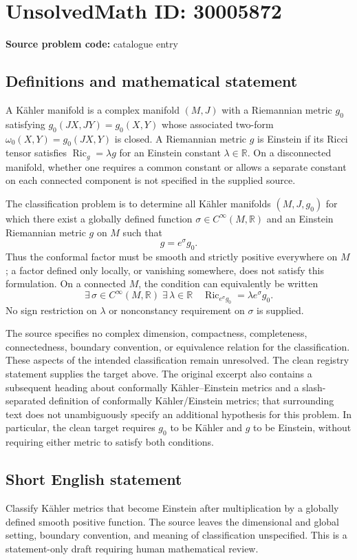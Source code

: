 \documentclass[11pt]{article}
\newcommand{\R}{\mathbb{R}}
\begin{document}
\section*{UnsolvedMath ID: 30005872}
\textbf{Source problem code:} catalogue entry
\subsection{Definitions and mathematical statement}
A Kähler manifold is a complex manifold $(M,J)$ with a Riemannian metric $g_0$ satisfying $g_0(JX,JY)=g_0(X,Y)$ whose associated two-form $\omega_0(X,Y)=g_0(JX,Y)$ is closed. A Riemannian metric $g$ is Einstein if its Ricci tensor satisfies $\operatorname{Ric}_g=\lambda g$ for an Einstein constant $\lambda\in\R$. On a disconnected manifold, whether one requires a common constant or allows a separate constant on each connected component is not specified in the supplied source.

The classification problem is to determine all Kähler manifolds $(M,J,g_0)$ for which there exist a globally defined function $\sigma\in C^\infty(M,\R)$ and an Einstein Riemannian metric $g$ on $M$ such that
\[
 g=e^{\sigma}g_0.
\]
Thus the conformal factor must be smooth and strictly positive everywhere on $M$; a factor defined only locally, or vanishing somewhere, does not satisfy this formulation. On a connected $M$, the condition can equivalently be written
\[
 \exists\,\sigma\in C^\infty(M,\R)\;\exists\,\lambda\in\R
 \quad \operatorname{Ric}_{e^{\sigma}g_0}=\lambda e^{\sigma}g_0.
\]
No sign restriction on $\lambda$ or nonconstancy requirement on $\sigma$ is supplied.

The source specifies no complex dimension, compactness, completeness, connectedness, boundary convention, or equivalence relation for the classification. These aspects of the intended classification remain unresolved. The clean registry statement supplies the target above. The original excerpt also contains a subsequent heading about conformally Kähler--Einstein metrics and a slash-separated definition of conformally Kähler/Einstein metrics; that surrounding text does not unambiguously specify an additional hypothesis for this problem. In particular, the clean target requires $g_0$ to be Kähler and $g$ to be Einstein, without requiring either metric to satisfy both conditions.
\subsection{Short English statement}
Classify Kähler metrics that become Einstein after multiplication by a globally defined smooth positive function. The source leaves the dimensional and global setting, boundary convention, and meaning of classification unspecified. This is a statement-only draft requiring human mathematical review.
\end{document}
